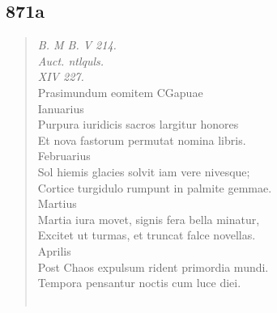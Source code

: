 \documentclass[11pt, a4paper]{report}
\begin{document}
            \subsection*{871a}
      \begin{verse}
      \textit{B. M B. V 214.} \\ \textit{Auct. ntlquls.} \\ \textit{XIV 227.} \\ Prasimundum eomitem CGapuae \\ Ianuarius \\ Purpura iuridicis sacros largitur honores \\ Et nova fastorum permutat nomina libris. \\ Februarius \\ Sol hiemis glacies solvit iam vere nivesque; \\ Cortice turgidulo rumpunt in palmite gemmae. \\ Martius \\ Martia iura movet, signis fera bella minatur, \\ Excitet ut turmas, et truncat falce novellas. \\ Aprilis \\ Post Chaos expulsum rident primordia mundi. \\ Tempora pensantur noctis cum luce diei. \\ 
        ﻿\pagebreak 

\end{verse}
\end{document}
